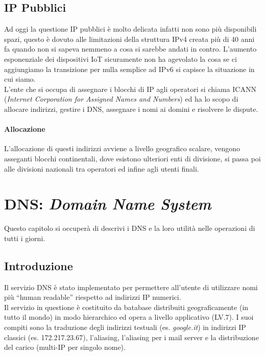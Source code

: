 \documentclass[12pt]{article}
\begin{document}
\subsection{IP Pubblici}
Ad oggi la questione IP pubblici è molto delicata infatti non sono più disponibili spazi, questo è dovuto alle limitazioni della struttura IPv4 creata più di 40 anni fa quando non si sapeva nemmeno a cosa si sarebbe andati in contro. L'aumento esponenziale dei dispositivi IoT sicuramente non ha agevolato la cosa se ci aggiungiamo la transizione per nulla semplice ad IPv6 si capisce la situazione in cui siamo.\\
L'ente che si occupa di assegnare i blocchi di IP agli operatori si chiama ICANN (\textit{Internet Corporation for Assigned Names and Numbers}) ed ha lo scopo di allocare indirizzi, gestire i DNS, assegnare i nomi ai domini e risolvere le dispute.

\paragraph{Allocazione} L'allocazione di questi indirizzi avviene a livello geografico scalare, vengono asseganti blocchi continentali, dove esistono ulteriori enti di divisione, si passa poi alle divisioni nazionali tra operatori ed infine agli utenti finali.


\section{DNS: \textit{Domain Name System}} \label{sec:dns} %
Questo capitolo si occuperà di descrivi i DNS e la loro utilità nelle operazioni di tutti i giorni.

\subsection{Introduzione} %
Il servizio DNS è stato implementato per permettere all'utente di utilizzare nomi più ``human readable'' riespetto ad indirizzi IP numerici.\\
Il servizio in questione è costituito da batabase distribuiti geograficamente (in tutto il mondo) in modo hierarchico ed opera a livello applicativo (LV.7). I suoi compiti sono la traduzione degli indirizzi testuali (es. \textit{google.it}) in indirizzi IP classici (es. 172.217.23.67), l'aliasing, l'aliasing per i mail server e la distribuzione del carico (multi-IP per singolo nome).
\end{document}
